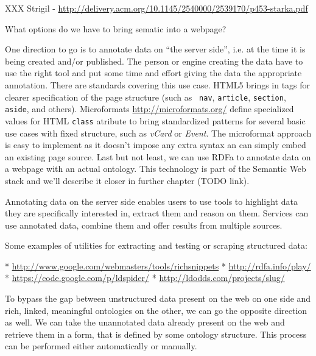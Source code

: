 XXX Strigil - \url{http://delivery.acm.org/10.1145/2540000/2539170/p453-starka.pdf}

What options do we have to bring sematic into a webpage? 


One direction to go is to annotate data on ``the server side'', i.e. at the time
it is being created and/or published. The person or engine creating the data
have to use the right tool and put some time and effort giving the data the
appropriate annotation. There are standards covering this use case. HTML5
brings in tags for clearer specification of the page structure (such as {\tt
nav}, {\tt article}, {\tt section}, {\tt aside}, and others). Microformats
\url{http://microformats.org/} define specialized values for HTML {\tt class}
atribute to bring standardized patterns for several basic use cases with fixed
structure, such as {\em vCard} or {\em Event}. The microformat approach is easy
to implement as it doesn't impose any extra syntax an can simply embed an
existing page source. Last but not least, we can use RDFa to annotate data on a
webpage with an actual ontology. This technology is part of the Semantic Web
stack and we'll describe it closer in further chapter (TODO link).

Annotating data on the server side enables users to use tools to highlight data
they are specifically interested in, extract them and reason on them. Services
can use annotated data, combine them and offer results from multiple sources. 

Some examples of utilities for extracting and testing or scraping structured data: 

\begitems
  * \url{http://www.google.com/webmasters/tools/richsnippets}
  * \url{http://rdfa.info/play/}
  * \url{https://code.google.com/p/ldspider/}
  * \url{http://ldodds.com/projects/slug/}
\enditems

To bypass the gap between unstructured data present on the web on one side and
rich, linked, meaningful ontologies on the other, we can go the opposite
direction as well. We can take the unannotated data already present on the web
and retrieve them in a form, that is defined by some ontology structure. This
process can be performed either automatically or manually. 

